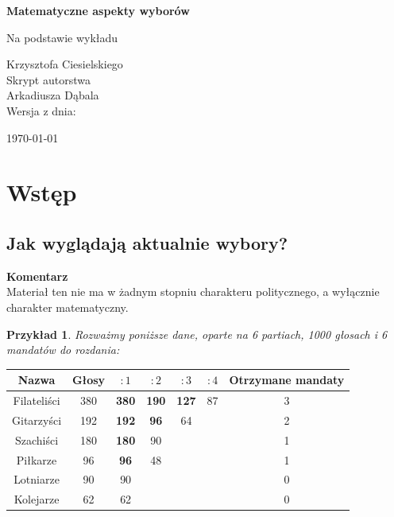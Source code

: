 \documentclass[12pt,a4paper]{article}
\theoremstyle{break}
\newcommand{\Komentarz}[1]{
	\begin{mdframed}[style=zadanie]
		\textbf{Komentarz}\\
		#1
	\end{mdframed}
	}
\newtheorem{example}{Przykład}[section]
\begin{document}
	
	\begin{titlepage}
		\centering
		\vspace{1cm}
		{\Huge\bfseries Matematyczne aspekty wyborów \par} 
		\vspace{1.5cm}
		{\large Na podstawie wykładu \par} 
		\vspace{0.5cm}
		{\Large Krzysztofa Ciesielskiego}\\
		\vspace{1cm}
		{\large Skrypt autorstwa}\\
		\vspace{0.5cm}
		{\Large Arkadiusza Dąbala}\\
		\vfill 
		{\large Wersja z dnia:}\\
		{\Large \today \par}  
		\vspace*{1cm}
	\end{titlepage}
	\newpage
	\tableofcontents
	\newpage
\section{Wstęp}
\subsection{Jak wyglądają aktualnie wybory?}
\Komentarz{Materiał ten nie ma w żadnym stopniu charakteru politycznego, a wyłącznie charakter matematyczny.}

\begin{example}
Rozważmy poniższe dane, oparte na 6 partiach, 1000 głosach i 6 mandatów do rozdania:
\end{example}

\begin{tabular}{|c|c|c|c|c|c|c|}\hline
	Nazwa        & Głosy & $:1$ & $:2$ & $:3$ & $:4$ & Otrzymane mandaty\\\hline
	Filateliści  & 380   & \textbf{380} & \textbf{190} & \textbf{127} & 87   & 3\\\hline
	Gitarzyści   & 192   & \textbf{192} & \textbf{96}  & 64   &       & 2\\\hline
	Szachiści    & 180   & \textbf{180} & 90    &       &       & 1\\\hline
	Piłkarze     & 96    & \textbf{96}  & 48    &       &       & 1\\\hline
	Lotniarze    & 90    & 90    &       &       &       & 0\\\hline
	Kolejarze    & 62    & 62    &       &       &       & 0\\\hline
\end{tabular}\\
\end{document}
